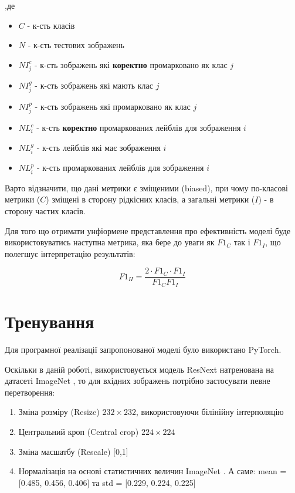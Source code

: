 \documentclass{udstu}
\begin{document}
,де \begin{itemize}[*]
        \item $C$ - к-сть класів
        \item $N$ - к-сть тестових зображень
        \item $NI^c_j$ - к-сть зображень які \textbf{коректно} промарковано як клас $j$
        \item $NI^g_j$ - к-сть зображень які мають клас $j$
        \item $NI^p_j$ - к-сть зображень які промарковано як клас $j$
        \item $NL^c_i$ - к-сть \textbf{коректно} промаркованих лейблів для зображення $i$
        \item $NL^g_i$ - к-сть лейблів які має зображення $i$
        \item $NL^p_i$ - к-сть промаркованих лейблів для зображення $i$
\end{itemize}

Варто відзначити, що дані метрики є зміщеними (biased),
при чому по-класові метрики ($C$) зміщені в сторону рідкісних класів,
а загальні метрики ($I$) - в сторону частих класів.

\clearpage

Для того що отримати унфіормене представлення про ефективність моделі
буде використовуватись наступна метрика,
яка бере до уваги як $F1_C$ так і $F1_I$, що полегшує інтерпретацію результатів:

\begin{equation}
F1_H = \frac{2 \cdot F1_C \cdot F1_I}{F1_C F1_I}
\end{equation}


\clearpage


\section{Тренування}

Для програмної реалізації запропонованої моделі було використано PyTorch.

Оскільки в даній роботі, використовується модель ResNext \cite{resnext} натренована
на датасеті ImageNet \cite{deng2009imagenet}, то для вхідних зображень потрібно
застосувати певне перетворення:

\begin{enumerate}[1)]
	\item Зміна розміру (Resize) $232 \times 232$,
	використовуючи білінійну інтерполяцію
	\item Центральний кроп (Central crop) $224 \times 224$
	\item Зміна масшатбу (Rescale) [0,1]
	\item Нормалізація на основі статистичних величин ImageNet \cite{deng2009imagenet}.
	А саме: mean = [0.485, 0.456, 0.406] та std = [0.229, 0.224, 0.225]
\end{enumerate}
\end{document}
